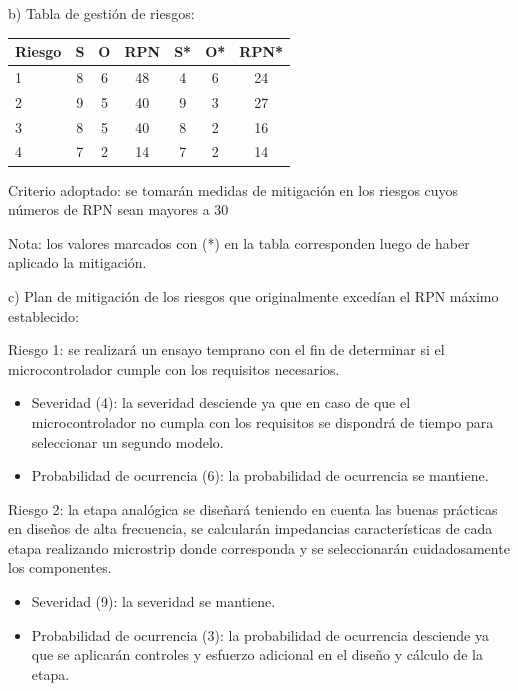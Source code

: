 \documentclass[11pt]{charter}
\begin{document}
b) Tabla de gestión de riesgos:

\begin{table}[htpb]
\centering
\begin{tabularx}{\linewidth}{@{}|X|c|c|c|c|c|c|@{}}
\hline
\rowcolor[HTML]{C0C0C0} 
Riesgo & S & O & RPN & S* & O* & RPN* \\ \hline
1      & 8  & 6  & \cellcolor[HTML]{EA6B66}48  & 4   & 6  & 24     \\ \hline
2      & 9  & 5  & \cellcolor[HTML]{EA6B66}40  & 9   & 3  & 27     \\ \hline
3      & 8  & 5  & \cellcolor[HTML]{EA6B66}40  & 8   & 2  & 16     \\ \hline
4      & 7  & 2  & 14  & 7   & 2  & 14     \\ \hline
\end{tabularx}%
\end{table}

Criterio adoptado: 
se tomarán medidas de mitigación en los riesgos cuyos números de RPN sean mayores a 30

Nota: los valores marcados con (*) en la tabla corresponden luego de haber aplicado la mitigación.

c) Plan de mitigación de los riesgos que originalmente excedían el RPN máximo establecido:
 
Riesgo 1: se realizará un ensayo temprano con el fin de determinar si el microcontrolador cumple con los requisitos necesarios.
\begin{itemize}  
\item Severidad (4): la severidad desciende ya que en caso de que el microcontrolador no cumpla con los requisitos se dispondrá de tiempo para seleccionar un segundo modelo. 
\item Probabilidad de ocurrencia (6): la probabilidad de ocurrencia se mantiene.
\end{itemize}

Riesgo 2: la etapa analógica se diseñará teniendo en cuenta las buenas prácticas en diseños de alta frecuencia, se calcularán impedancias características de cada etapa realizando microstrip donde corresponda y se seleccionarán cuidadosamente los componentes.
\begin{itemize}  
\item Severidad (9): la severidad se mantiene.
\item Probabilidad de ocurrencia (3): la probabilidad de ocurrencia desciende ya que se aplicarán controles y esfuerzo adicional en el diseño y cálculo de la etapa.
\end{itemize}
   
\end{document}
